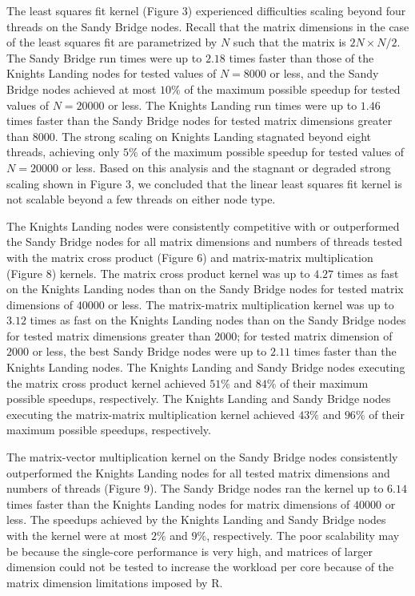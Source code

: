 The least squares fit kernel (Figure 3) experienced difficulties scaling beyond
  four threads on the Sandy Bridge nodes.
Recall that the matrix dimensions in the case of the least squares fit are
  parametrized by $N$ such that the matrix is $2N \times N/2$.
The Sandy Bridge run times were up to $2.18$ times faster than those of the
  Knights Landing nodes for tested values of $N=8000$ or less, and the Sandy
  Bridge nodes achieved at most $10\%$ of the maximum possible speedup for
  tested values of $N=20000$ or less.
The Knights Landing run times were up to $1.46$ times faster than the Sandy
  Bridge nodes for tested matrix dimensions greater than $8000$.
The strong scaling on Knights Landing stagnated beyond eight threads, achieving
  only $5\%$ of the maximum possible speedup for tested values of $N=20000$ or
  less.
Based on this analysis and the stagnant or degraded strong scaling shown in
  Figure 3, we concluded that the linear least squares fit kernel is not
  scalable beyond a few threads on either node type.

The Knights Landing nodes were consistently competitive with or outperformed the
  Sandy Bridge nodes for all matrix dimensions and numbers of threads tested
  with the matrix cross product (Figure 6) and matrix-matrix multiplication
  (Figure 8) kernels.
The matrix cross product kernel was up to $4.27$ times as fast on the Knights
  Landing nodes than on the Sandy Bridge nodes for tested matrix dimensions of
  $40000$ or less.
The matrix-matrix multiplication kernel was up to $3.12$ times as fast on the
  Knights Landing nodes than on the Sandy Bridge nodes for tested matrix
  dimensions greater than $2000$; for tested matrix dimension of $2000$ or less,
  the best Sandy Bridge nodes were up to $2.11$ times faster than the Knights
  Landing nodes.
The Knights Landing and Sandy Bridge nodes executing the matrix cross product
  kernel achieved $51\%$ and $84\%$ of their maximum possible speedups,
  respectively.
The Knights Landing and Sandy Bridge nodes executing the matrix-matrix
  multiplication kernel achieved $43\%$ and $96\%$ of their maximum possible
  speedups, respectively.

The matrix-vector multiplication kernel on the Sandy Bridge nodes consistently
  outperformed the Knights Landing nodes for all tested matrix dimensions and
  numbers of threads (Figure 9).
The Sandy Bridge nodes ran the kernel up to $6.14$ times faster than the
  Knights Landing nodes for matrix dimensions of $40000$ or less.
The speedups achieved by the Knights Landing and Sandy Bridge nodes with the
  kernel were at most $2\%$ and $9\%$, respectively.
The poor scalability may be because the single-core performance is very high,
  and matrices of larger dimension could not be tested to increase the workload
  per core because of the matrix dimension limitations imposed by R.

